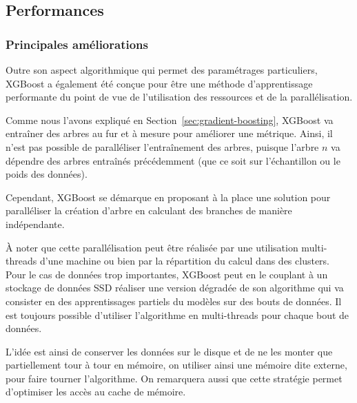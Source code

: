 \subsection{Performances}
\label{sec:perf}
\subsubsection{Principales améliorations}
Outre son aspect algorithmique qui permet des paramétrages particuliers, XGBoost a également été conçue pour être une méthode d'apprentissage performante du point de vue de l'utilisation des ressources et de la parallélisation.

Comme nous l'avons expliqué en Section~\ref{sec:gradient-boosting}, XGBoost va entraîner des arbres au fur et à mesure pour améliorer une métrique. Ainsi, il n'est pas possible de paralléliser l'entraînement des arbres, puisque l'arbre $n$ va dépendre des arbres entraînés précédemment (que ce soit sur l'échantillon ou le poids des données).

Cependant, XGBoost se démarque en proposant à la place une solution pour paralléliser la création d'arbre en calculant des branches de manière indépendante.

À noter que cette parallélisation peut être réalisée par une utilisation multi-threads d'une machine ou bien par la répartition du calcul dans des clusters.
Pour le cas de données trop importantes, XGBoost peut en le couplant à un stockage de données SSD réaliser une version dégradée de son algorithme qui va consister en des apprentissages partiels du modèles sur des bouts de données. Il est toujours possible d'utiliser l'algorithme en multi-threads pour chaque bout de données.

L'idée est ainsi de conserver les données sur le disque et de ne les monter que partiellement tour à tour en mémoire, on utiliser ainsi une mémoire dite \og externe\fg, pour faire tourner l'algorithme. On remarquera aussi que cette stratégie permet d'optimiser les accès au cache de mémoire.

